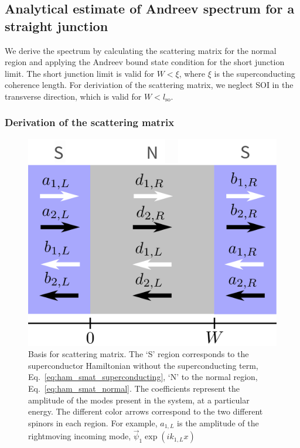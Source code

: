 	\subsection{Analytical estimate of Andreev spectrum for a straight junction}
		
		We derive the spectrum by calculating the scattering matrix for the normal region and applying the Andreev bound state condition for the short junction limit\cite{beenakker1991universal, sticlet_robustness_2017}. 
		The short junction limit is valid for $W<\xi$, where $\xi$ is the superconducting coherence length.
		For deriviation of the scattering matrix, we neglect SOI in the transverse direction, which is valid for $W<l_\text{so}$.

		\subsubsection{Derivation of the scattering matrix}

			\begin{figure}[!htb]
			\centering
			\includegraphics[width=0.75\columnwidth]{images/scattering}
			\caption{Basis for scattering matrix. 
			The `S' region corresponds to the superconductor Hamiltonian without the superconducting term, Eq.~\eqref{eq:ham_smat_superconducting}, `N' to the normal region, Eq.~\eqref{eq:ham_smat_normal}. 
			The coefficients represent the amplitude of the modes present in the system, at a particular energy.
			The different color arrows correspond to the two different spinors in each region.
			For example, $a_{1,L}$ is the amplitude of the rightmoving incoming mode, $\vec{\psi}_1 \exp\left(i k_{1,L} x\right)$}
			\label{fig:scattering}
			\end{figure}
			
